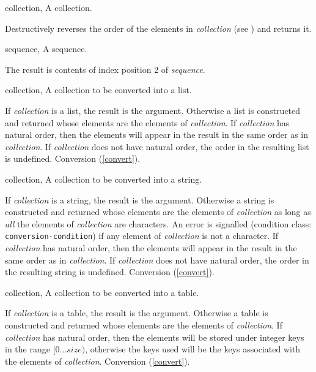 \begin{optDefinition}
%
\begin{genericargs}
    \item[collection, \classref{collection}] A collection.
\end{genericargs}
%
\result%
Destructively reverses the order of the elements in {\em collection\/} (see
) and returns it.


%
\begin{genericargs}
    \item[sequence, \classref{sequence}] A sequence.
\end{genericargs}
%
\result%
The result is contents of index position 2 of {\em sequence}.

%
\begin{specargs}
    \item[collection, \classref{collection}] A collection to be converted into a
    list.
\end{specargs}
%
\result%
If {\em collection\/} is a list, the result is the argument.  Otherwise
a list is constructed and returned whose elements are the elements of {\em
    collection}.  If {\em collection\/} has natural order, then the elements
will appear in the result in the same order as in {\em collection}.  If {\em
    collection\/} does not have natural order, the order in the resulting list
is undefined.
%
\seealso%
Conversion (\ref{convert}).

%
\begin{specargs}
    \item[collection, \classref{collection}] A collection to be converted into a
    string.
\end{specargs}
%
\result%
If {\em collection\/} is a string, the result is the argument.
Otherwise a string is constructed and returned whose elements are the elements
of {\em collection\/} as long as {\em all\/} the elements of {\em collection\/}
are characters.  An error is signalled (condition class: {\tt
    conversion-condition}) if any element
of {\em collection\/} is not a character.  If {\em collection\/} has natural
order, then the elements will appear in the result in the same order as in {\em
    collection}.  If {\em collection\/} does not have natural order, the order
in the resulting string is undefined.
%
\seealso%
Conversion (\ref{convert}).

%
\begin{specargs}
    \item[collection, \classref{collection}] A collection to be converted into a
    table.
\end{specargs}
%
\result%
If {\em collection\/} is a table, the result is the argument.  Otherwise
a table is constructed and returned whose elements are the elements of {\em
    collection}.  If {\em collection\/} has natural order, then the elements
will be stored under integer keys in the range $[0\ldots{}size)$, otherwise the
keys used will be the keys associated with the elements of {\em collection}.
%
\seealso%
Conversion (\ref{convert}).


\end{optDefinition}
